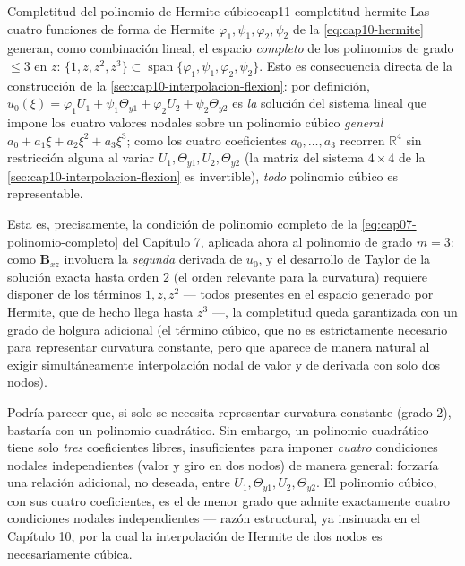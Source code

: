 \begin{ecnimportante}{Completitud del polinomio de Hermite cúbico}{cap11-completitud-hermite}
Las cuatro funciones de forma de Hermite $\varphi_1,\psi_1,\varphi_2,\psi_2$ de la \cref{eq:cap10-hermite} generan, como combinación lineal, el espacio \emph{completo} de los polinomios de grado $\leq3$ en $z$: $\{1,z,z^2,z^3\}\subset\operatorname{span}\{\varphi_1,\psi_1,\varphi_2,\psi_2\}$. Esto es consecuencia directa de la construcción de la \cref{sec:cap10-interpolacion-flexion}: por definición, $u_0(\xi)=\varphi_1U_1+\psi_1\Theta_{y1}+\varphi_2U_2+\psi_2\Theta_{y2}$ es \emph{la} solución del sistema lineal que impone los cuatro valores nodales sobre un polinomio cúbico \emph{general} $a_0+a_1\xi+a_2\xi^2+a_3\xi^3$; como los cuatro coeficientes $a_0,\dots,a_3$ recorren $\mathbb R^4$ sin restricción alguna al variar $U_1,\Theta_{y1},U_2,\Theta_{y2}$ (la matriz del sistema $4\times4$ de la \cref{sec:cap10-interpolacion-flexion} es invertible), \emph{todo} polinomio cúbico es representable.
\end{ecnimportante}

Esta es, precisamente, la condición de polinomio completo de la \cref{eq:cap07-polinomio-completo} del Capítulo 7, aplicada ahora al polinomio de grado $m=3$: como $\bm B_{xz}$ involucra la \emph{segunda} derivada de $u_0$, y el desarrollo de Taylor de la solución exacta hasta orden $2$ (el orden relevante para la curvatura) requiere disponer de los términos $1,z,z^2$ --- todos presentes en el espacio generado por Hermite, que de hecho llega hasta $z^3$ ---, la completitud queda garantizada con un grado de holgura adicional (el término cúbico, que no es estrictamente necesario para representar curvatura constante, pero que aparece de manera natural al exigir simultáneamente interpolación nodal de valor y de derivada con solo dos nodos).

\begin{observacion}
Podría parecer que, si solo se necesita representar curvatura constante (grado 2), bastaría con un polinomio cuadrático. Sin embargo, un polinomio cuadrático tiene solo \emph{tres} coeficientes libres, insuficientes para imponer \emph{cuatro} condiciones nodales independientes (valor y giro en dos nodos) de manera general: forzaría una relación adicional, no deseada, entre $U_1,\Theta_{y1},U_2,\Theta_{y2}$. El polinomio cúbico, con sus cuatro coeficientes, es el de menor grado que admite exactamente cuatro condiciones nodales independientes --- razón estructural, ya insinuada en el Capítulo 10, por la cual la interpolación de Hermite de dos nodos es necesariamente cúbica.
\end{observacion}

